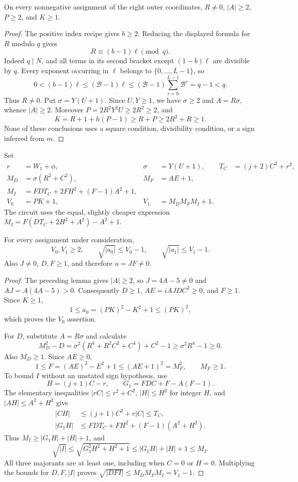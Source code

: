 \begin{lemma}
\label{lem:nine-R-nonzero}
On every nonnegative assignment of the eight outer coordinates,
$R\ne0$, $|A|\ge2$, $P\ge2$, and $K\ge1$.
\end{lemma}
\begin{proof}
The positive index recipe gives $b\ge2$. Reducing the displayed formula
for $R$ modulo $q$ gives
\[
 R\equiv(b-1)\ell\pmod q.
\]
Indeed $q\mid N$, and all terms in its second bracket except
$(1-b)\ell$ are divisible by $q$. Every exponent occurring in $\ell$
belongs to $\{0,\ldots,L-1\}$, so
\[
 0<(b-1)\ell\le(\mathcal B-1)\ell
       \le(\mathcal B-1)\sum_{r=0}^{L-1}\mathcal B^r=q-1<q.
\]
Thus $R\ne0$. Put $\sigma=Y(U+1)$. Since $U,Y\ge1$, we have
$\sigma\ge2$ and $A=R\sigma$, whence $|A|\ge2$.
Moreover $P=2R^2Y^2U\ge2R^2\ge2$, and
\[
 K=R+1+h(P-1)\ge R+P\ge2R^2+R\ge1.
\]
None of these conclusions uses a square condition, divisibility condition,
or a sign inferred from $m$.
\end{proof}

Set
\begin{align*}
 r&=W_1+\phi,&\sigma&=Y(U+1),&T_C&=(j+2)C^2+r^2,\\
 M_D&=\sigma(R^2+C^2),&M_F&=AE+1,\\
 M_I&=FD T_C+2FH^2+(F-1)A^2+1,\\
 V_0&=PK+1,&V_1&=M_D M_F M_I+1.
\end{align*}
The circuit uses the equal, slightly cheaper expression
$M_I=F(DT_C+2H^2+A^2)-A^2+1$.

\begin{lemma}
\label{lem:nine-structured-bounds}
For every assignment under consideration,
\[
 V_0,V_1\ge2,\qquad
 \sqrt{|a_0|}\le V_0-1,\qquad
 \sqrt{|a_1|}\le V_1-1.
\]
Also $J\ne0$, $D,F\ge1$, and therefore $u=JF\ne0$.
\end{lemma}
\begin{proof}
The preceding lemma gives $|A|\ge2$, so $J=4A-5\ne0$ and
$AJ=A(4A-5)>0$. Consequently $D\ge1$,
$AE=iAJDC^2\ge0$, and $F\ge1$.
Since $K\ge1$,
\[
 1\le a_0=(PK)^2-K^2+1\le(PK)^2,
\]
which proves the $V_0$ assertion.

For $D$, substitute $A=R\sigma$ and calculate
\[
 M_D^2-D=\sigma^2(R^4+R^2C^2+C^4)+C^2-1
       \ge\sigma^2R^4-1\ge0.
\]
Also $M_D\ge1$. Since $AE\ge0$,
\[
 1\le F=(AE)^2-E^2+1\le(AE+1)^2=M_F^2,
 \qquad M_F\ge1.
\]
To bound $I$ without an unstated sign hypothesis, use
\[
 H=(j+1)C-r,\qquad G_1=FDC+F-A(F-1).
\]
The elementary inequalities $|rC|\le r^2+C^2$,
$|H|\le H^2$ for integer $H$, and $|AH|\le A^2+H^2$ give
\begin{align*}
 |CH|&\le(j+1)C^2+r|C|\le T_C,\\
 |G_1H|&\le FD T_C+FH^2+(F-1)(A^2+H^2).
\end{align*}
Thus $M_I\ge|G_1H|+|H|+1$, and
\[
 \sqrt{|I|}\le\sqrt{G_1^2H^2+H^2+1}
             \le|G_1H|+|H|+1\le M_I.
\]
All three majorants are at least one, including when $C=0$ or $H=0$.
Multiplying the bounds for $D,F,|I|$ proves
$\sqrt{|DFI|}\le M_D M_F M_I=V_1-1$.
\end{proof}

